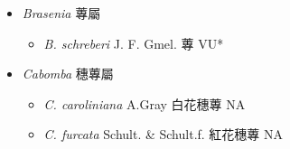 
  \begin{itemize}
 \item[] \textit{Brasenia} 蓴屬
                                
  \begin{itemize}
        \item[] \textit{B. schreberi} J. F. Gmel.  蓴   VU*
  \end{itemize}
 \item[] \textit{Cabomba} 穗蓴屬
                                
  \begin{itemize}
        \item[] \textit{C. caroliniana} A.Gray  白花穗蓴   NA
        \item[] \textit{C. furcata} Schult. \& Schult.f.  紅花穗蓴   NA
  \end{itemize}
  \end{itemize}
